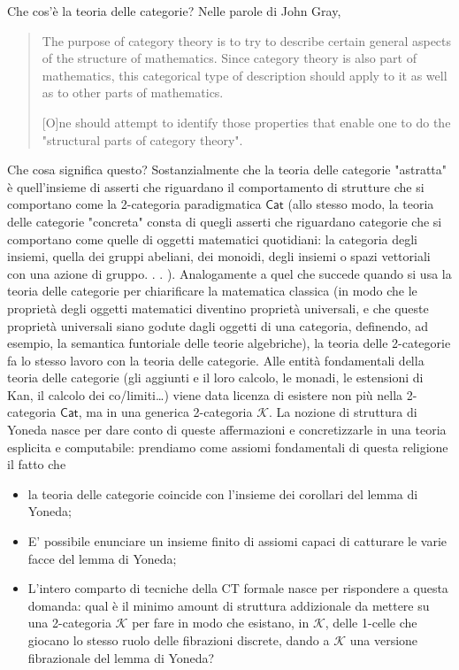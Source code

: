 \documentclass[11pt]{article}
\def\Cat{\mathsf{Cat}}
\theoremstyle{reference}
\begin{document}
Che cos’è la teoria delle categorie? Nelle parole di John Gray,
\begin{quote}
The purpose of category theory is to try to describe certain general
aspects of the structure of mathematics. Since category theory
is also part of mathematics, this categorical type of description
should apply to it as well as to other parts of mathematics.

[O]ne should attempt to identify those properties that enable one
to do the "structural parts of category theory".
\end{quote}
Che cosa significa questo? Sostanzialmente che la teoria
delle categorie "astratta" è quell’insieme di asserti che
riguardano il comportamento di strutture che si comportano
come la 2-categoria paradigmatica \(\Cat\) (allo stesso modo,
la teoria delle categorie "concreta" consta di quegli
asserti che riguardano categorie che si comportano come
quelle di oggetti matematici quotidiani: la categoria degli
insiemi, quella dei gruppi abeliani, dei monoidi, degli
insiemi o spazi vettoriali con una azione di gruppo. . . ).
Analogamente a quel che succede quando si usa la teoria
delle categorie per chiarificare la matematica classica (in
modo che le proprietà degli oggetti matematici diventino
proprietà universali, e che queste proprietà universali
siano godute dagli oggetti di una categoria, definendo, ad
esempio, la semantica funtoriale delle teorie algebriche),
la teoria delle 2-categorie fa lo stesso lavoro con la
teoria delle categorie. Alle entità fondamentali della
teoria delle categorie (gli aggiunti e il loro calcolo, le
monadi, le estensioni di Kan, il calcolo dei co/limiti\dots{})
viene data licenza di esistere non più nella 2-categoria
\(\Cat\), ma in una generica 2-categoria \(\mathcal K\). La
nozione di struttura di Yoneda nasce per dare conto di
queste affermazioni e concretizzarle in una teoria esplicita
e computabile: prendiamo come assiomi fondamentali di questa
religione il fatto che

\begin{itemize}
\item la teoria delle categorie coincide con l’insieme dei
corollari del lemma di Yoneda;
\item E’ possibile enunciare un insieme finito di assiomi capaci
di catturare le varie facce del lemma di Yoneda;
\item L’intero comparto di tecniche della CT formale nasce per
rispondere a questa domanda: qual è il minimo amount di
struttura addizionale da mettere su una 2-categoria
\(\mathcal K\) per fare in modo che esistano, in \(\mathcal
  K\), delle 1-celle che giocano lo stesso ruolo delle
fibrazioni discrete, dando a \(\mathcal K\) una versione
fibrazionale del lemma di Yoneda?
\end{itemize}
\end{document}
